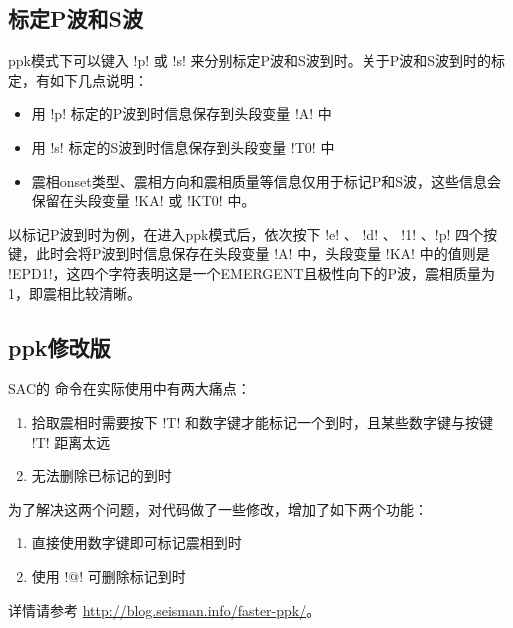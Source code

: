 \subsection{标定P波和S波}
ppk模式下可以键入 !p! 或 !s! 来分别标定P波和S波到时。关于P波和S波到时的标定，有如下几点说明：

\begin{itemize}
\item 用 !p! 标定的P波到时信息保存到头段变量 !A! 中
\item 用 !s! 标定的S波到时信息保存到头段变量 !T0! 中
\item 震相onset类型、震相方向和震相质量等信息仅用于标记P和S波，这些信息会保留在头段变量 !KA! 或 !KT0! 中。
\end{itemize}

以标记P波到时为例，在进入ppk模式后，依次按下 !e! 、 !d! 、 !1! 、!p! 四个按键，此时会将P波到时信息保存在头段变量 !A! 中，头段变量 !KA! 中的值则是 !EPD1!，这四个字符表明这是一个EMERGENT且极性向下的P波，震相质量为1，即震相比较清晰。

\subsection{ppk修改版}
SAC的  命令在实际使用中有两大痛点：
\begin{enumerate}
\item 拾取震相时需要按下 !T! 和数字键才能标记一个到时，且某些数字键与按键 !T! 距离太远
\item 无法删除已标记的到时
\end{enumerate}

为了解决这两个问题，对代码做了一些修改，增加了如下两个功能：
\begin{enumerate}
\item 直接使用数字键即可标记震相到时
\item 使用 !@! 可删除标记到时
\end{enumerate}

详情请参考 \url{http://blog.seisman.info/faster-ppk/}。
